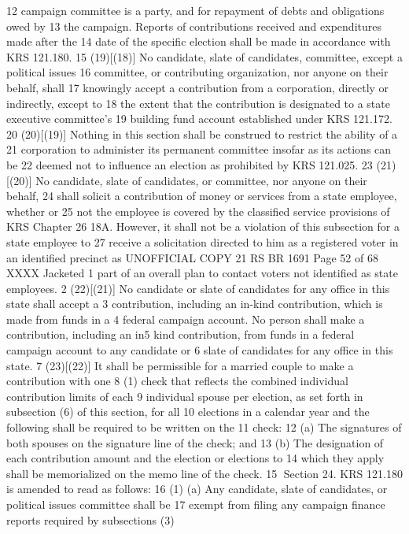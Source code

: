 12 campaign committee is a party, and for repayment of debts and obligations owed by
13 the campaign. Reports of contributions received and expenditures made after the
14 date of the specific election shall be made in accordance with KRS 121.180.
15 (19)[(18)] No candidate, slate of candidates, committee, except a political issues
16 committee, or contributing organization, nor anyone on their behalf, shall
17 knowingly accept a contribution from a corporation, directly or indirectly, except to
18 the extent that the contribution is designated to a state executive committee's
19 building fund account established under KRS 121.172.
20 (20)[(19)] Nothing in this section shall be construed to restrict the ability of a
21 corporation to administer its permanent committee insofar as its actions can be
22 deemed not to influence an election as prohibited by KRS 121.025.
23 (21)[(20)] No candidate, slate of candidates, or committee, nor anyone on their behalf,
24 shall solicit a contribution of money or services from a state employee, whether or
25 not the employee is covered by the classified service provisions of KRS Chapter
26 18A. However, it shall not be a violation of this subsection for a state employee to
27 receive a solicitation directed to him as a registered voter in an identified precinct as 
UNOFFICIAL COPY 21 RS BR 1691
Page 52 of 68
XXXX Jacketed
1 part of an overall plan to contact voters not identified as state employees.
2 (22)[(21)] No candidate or slate of candidates for any office in this state shall accept a
3 contribution, including an in-kind contribution, which is made from funds in a
4 federal campaign account. No person shall make a contribution, including an in5 kind contribution, from funds in a federal campaign account to any candidate or
6 slate of candidates for any office in this state.
7 (23)[(22)] It shall be permissible for a married couple to make a contribution with one
8 (1) check that reflects the combined individual contribution limits of each
9 individual spouse per election, as set forth in subsection (6) of this section, for all
10 elections in a calendar year and the following shall be required to be written on the
11 check:
12 (a) The signatures of both spouses on the signature line of the check; and
13 (b) The designation of each contribution amount and the election or elections to
14 which they apply shall be memorialized on the memo line of the check.
15 Section 24. KRS 121.180 is amended to read as follows:
16 (1) (a) Any candidate, slate of candidates, or political issues committee shall be
17 exempt from filing any campaign finance reports required by subsections (3)
